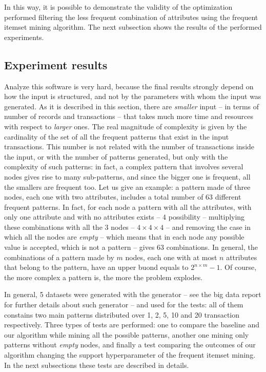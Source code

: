 \documentclass{acm_proc_article-sp-sigmod09}
\begin{document}
In this way, it is possible to demonstrate the validity of the optimization performed filtering the less frequent combination of attributes using the frequent itemset mining algorithm. The next subsection shows the results of the performed experiments.

\subsection{Experiment results}
\label{sec:exp-res}
Analyze this software is very hard, because the final results strongly depend on how the input is structured, and not by the parameters with whom the input was generated. As it is described in this section, there are \emph{smaller} input -- in terms of number of records and transactions -- that takes much more time and resources with respect to \emph{larger} ones. The real magnitude of complexity is given by the cardinality of the set of all the frequent patterns that exist in the input transactions. This number is not related with the number of transactions inside the input, or with the number of patterns generated, but only with the complexity of such patterns: in fact, a complex pattern that involves several nodes gives rise to many sub-patterns, and since the bigger one is frequent, all the smallers are frequent too. Let us give an example: a pattern made of three nodes, each one with two attributes, includes a total number of 63 different frequent patterns. In fact, for each node a pattern with all the attributes, with only one attribute and with no attributes exists -- 4 possibility -- multiplying these combinations with all the 3 nodes -- $4 \times 4 \times 4$ -- and removing the case in which all the nodes are \emph{empty} -- which means that in each node any possible value is accepted, which is not a pattern -- gives 63 combinations. In general, the combinations of a pattern made by $m$ nodes, each one with at most $n$ attributes that belong to the pattern, have an upper buond equals to $2^{n \times m} - 1$. Of course, the more complex a pattern is, the more the problem explodes.

In general, 5 datasets were generated with the generator -- see the big data report for further details about such generator -- and used for the tests: all of them constains two main patterns distributed over 1, 2, 5, 10 and 20 transaction respectively. Three types of tests are performed: one to compare the baseline and our algorithm while mining all the possible patterns, another one mining only patterns without \emph{empty} nodes, and finally a test comparing the outcomes of our algorithm changing the support hyperparameter of the frequent itemset mining. In the next subsections these tests are described in details.
\end{document}
